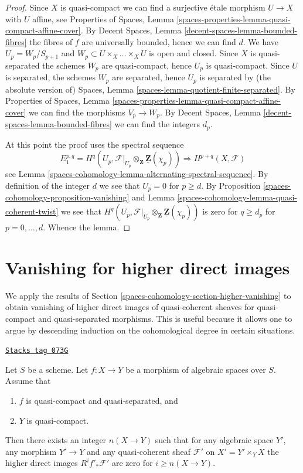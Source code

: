 \begin{proof}
Since $X$ is quasi-compact we can find a surjective \'etale morphism
$U \to X$ with $U$ affine, see
Properties of Spaces, Lemma
\ref{spaces-properties-lemma-quasi-compact-affine-cover}.
By
Decent Spaces, Lemma \ref{decent-spaces-lemma-bounded-fibres}
the fibres of $f$ are universally bounded, hence we can find $d$.
We have $U_p = W_p/S_{p + 1}$ and $W_p \subset U \times_X \ldots \times_X U$
is open and closed. Since $X$ is quasi-separated the schemes
$W_p$ are quasi-compact, hence $U_p$ is quasi-compact.
Since $U$ is separated, the schemes $W_p$ are separated, hence
$U_p$ is separated by (the absolute version of)
Spaces, Lemma \ref{spaces-lemma-quotient-finite-separated}.
By
Properties of Spaces, Lemma
\ref{spaces-properties-lemma-quasi-compact-affine-cover}
we can find the morphisms $V_p \to W_p$.
By
Decent Spaces, Lemma \ref{decent-spaces-lemma-bounded-fibres}
we can find the integers $d_p$.

\medskip\noindent
At this point the proof uses the spectral sequence
$$
E_1^{p, q} =
H^q(U_p, \mathcal{F}|_{U_p} \otimes_\mathbf{Z} \underline{\mathbf{Z}}(\chi_p))
\Rightarrow
H^{p + q}(X, \mathcal{F})
$$
see
Lemma \ref{spaces-cohomology-lemma-alternating-spectral-sequence}.
By definition of the integer $d$ we see that $U_p = 0$ for $p \geq d$.
By Proposition \ref{spaces-cohomology-proposition-vanishing}
and
Lemma \ref{spaces-cohomology-lemma-quasi-coherent-twist}
we see that
$H^q(U_p,
\mathcal{F}|_{U_p} \otimes_\mathbf{Z} \underline{\mathbf{Z}}(\chi_p))$
is zero for $q \geq d_p$ for $p = 0, \ldots, d$.
Whence the lemma.
\end{proof}

\section{Vanishing for higher direct images}
\label{spaces-cohomology-section-vanishing-higher-direct-images}
We apply the results of
Section \ref{spaces-cohomology-section-higher-vanishing}
to obtain vanishing of higher direct images of quasi-coherent sheaves
for quasi-compact and quasi-separated morphisms. This is useful because
it allows one to argue by descending induction on the cohomological degree
in certain situations.

\begin{lemma}
\label{spaces-cohomology-lemma-vanishing-higher-direct-images}
\href{https://stacks.math.columbia.edu/tag/073G}{\texttt{Stacks tag 073G}}

Let $S$ be a scheme. Let $f : X \to Y$ be a
morphism of algebraic spaces over $S$.
Assume that
\begin{enumerate}
\item $f$ is quasi-compact and quasi-separated, and
\item $Y$ is quasi-compact.
\end{enumerate}
Then there exists an integer $n(X \to Y)$ such that
for any algebraic space $Y'$, any morphism $Y' \to Y$
and any quasi-coherent sheaf $\mathcal{F}'$ on $X' = Y' \times_Y X$
the higher direct images $R^if'_*\mathcal{F}'$ are zero for
$i \geq n(X \to Y)$.
\end{lemma}

